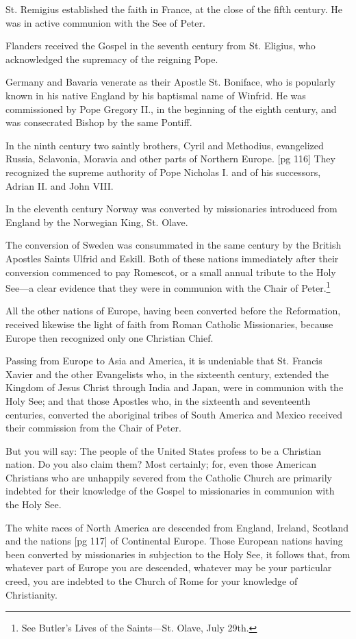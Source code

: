 St. Remigius established the faith in France, at
the close of the fifth century. He was in active
communion with the See of Peter.

Flanders received the Gospel in the seventh century
from St. Eligius, who acknowledged the supremacy
of the reigning Pope.

Germany and Bavaria venerate as their Apostle
St. Boniface, who is popularly known in his native
England by his baptismal name of Winfrid. He
was commissioned by Pope Gregory II., in the beginning
of the eighth century, and was consecrated
Bishop by the same Pontiff.

In the ninth century two saintly brothers, Cyril
and Methodius, evangelized Russia, Sclavonia,
Moravia and other parts of Northern Europe.
[pg 116]
They recognized the supreme authority of Pope
Nicholas I. and of his successors, Adrian II. and
John VIII.

In the eleventh century Norway was converted
by missionaries introduced from England by the
Norwegian King, St. Olave.

The conversion of Sweden was consummated in
the same century by the British Apostles Saints
Ulfrid and Eskill. Both of these nations immediately
after their conversion commenced to pay
Romescot, or a small annual tribute to the Holy
See—a clear evidence that they were in communion
with the Chair of Peter.\footnote{See Butler's
Lives of the Saints—St. Olave, July 29th.}

All the other nations of Europe, having been
converted before the Reformation, received likewise
the light of faith from Roman Catholic Missionaries,
because Europe then recognized only
one Christian Chief.

Passing from Europe to Asia and America, it
is undeniable that St. Francis Xavier and the other
Evangelists who, in the sixteenth century, extended
the Kingdom of Jesus Christ through
India and Japan, were in communion with the
Holy See; and that those Apostles who, in the
sixteenth and seventeenth centuries, converted the
aboriginal tribes of South America and Mexico received
their commission from the Chair of Peter.

But you will say: The people of the United
States profess to be a Christian nation. Do you
also claim them? Most certainly; for, even those
American Christians who are unhappily severed
from the Catholic Church are primarily indebted
for their knowledge of the Gospel to missionaries
in communion with the Holy See.

The white races of North America are descended
from England, Ireland, Scotland and the nations
[pg 117]
of Continental Europe. Those European nations
having been converted by missionaries in subjection
to the Holy See, it follows that, from whatever
part of Europe you are descended, whatever
may be your particular creed, you are indebted
to the Church of Rome for your knowledge of
Christianity.

